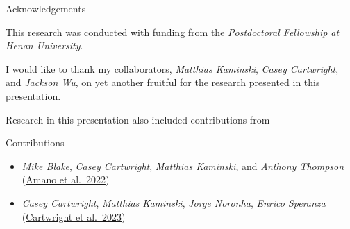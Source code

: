 \documentclass[xcolor=dvipsnames]{beamer}
\begin{document}
\begin{frame}{Acknowledgements}

  This research was conducted with funding from the \emph{Postdoctoral
  Fellowship at Henan University}.

  \vfill 

  I would like to thank my collaborators, \emph{Matthias Kaminski},
  \emph{Casey Cartwright}, and \emph{Jackson Wu}, on yet another fruitful
  for the research presented in this presentation.

  \vfill 

  Research in this presentation also included contributions from

  \begin{block}{Contributions}
    {\small
    \begin{itemize}
      \item
        \emph{Mike Blake}, \emph{Casey Cartwright}, \emph{Matthias Kaminski},
        and \emph{Anthony Thompson}\\
        (\href{https://inspirehep.net/literature/2174613}{Amano et al.~2022})
      \item
        \emph{Casey Cartwright}, \emph{Matthias Kaminski}, \emph{Jorge
        Noronha}, \emph{Enrico Speranza}\\
        (\href{https://inspirehep.net/literature/1994753}{Cartwright et al.~2023})
    \end{itemize}
  }
  \end{block}

\end{frame}



\end{document}
